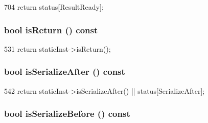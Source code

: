 \begin{DoxyCode}
704 { return status[ResultReady]; }
\end{DoxyCode}
\hypertarget{classBaseDynInst_a56f87bc75115f1dcea77803b01f40d2c}{
\subsubsection[{isReturn}]{\setlength{\rightskip}{0pt plus 5cm}bool isReturn () const}}
\label{classBaseDynInst_a56f87bc75115f1dcea77803b01f40d2c}



\begin{DoxyCode}
531 { return staticInst->isReturn(); }
\end{DoxyCode}
\hypertarget{classBaseDynInst_a4d1c24871e03e495a1841ea16d11a68f}{
\subsubsection[{isSerializeAfter}]{\setlength{\rightskip}{0pt plus 5cm}bool isSerializeAfter () const}}
\label{classBaseDynInst_a4d1c24871e03e495a1841ea16d11a68f}



\begin{DoxyCode}
542     { return staticInst->isSerializeAfter() || status[SerializeAfter]; }
\end{DoxyCode}
\hypertarget{classBaseDynInst_aa350b74ea660b6821bd37cd139bd917b}{
\subsubsection[{isSerializeBefore}]{\setlength{\rightskip}{0pt plus 5cm}bool isSerializeBefore () const}}
\label{classBaseDynInst_aa350b74ea660b6821bd37cd139bd917b}



